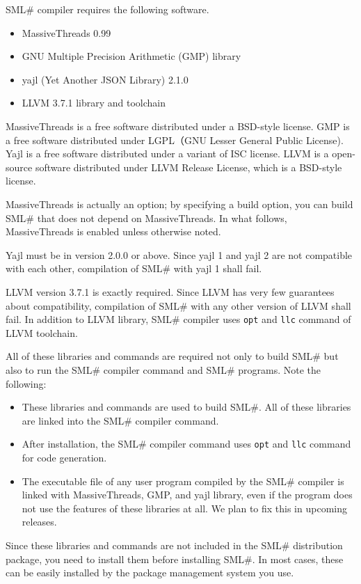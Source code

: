 \documentclass{jbook}
\newcommand{\smlsharp}{SML\#}
\begin{document}
	\smlsharp{} compiler requires the following software.
\begin{itemize}
\item MassiveThreads 0.99
\item GNU Multiple Precision Arithmetic (GMP) library
\item yajl (Yet Another JSON Library) 2.1.0
\item LLVM 3.7.1 library and toolchain
\end{itemize}
	MassiveThreads is a free software distributed under a BSD-style
license.
	GMP is a free software distributed under LGPL（GNU Lesser General
Public License).
	Yajl is a free software distributed under a variant of ISC license.
	LLVM is a open-source software distributed under LLVM Release License,
which is a BSD-style license.

	MassiveThreads is actually an option;
by specifying a build option,
you can build \smlsharp{} that does not depend on MassiveThreads.
	In what follows,
MassiveThreads is enabled unless otherwise noted.

	Yajl must be in version 2.0.0 or above.
	Since yajl 1 and yajl 2 are not compatible with each other,
compilation of \smlsharp{} with yajl 1 shall fail.

	LLVM version 3.7.1 is exactly required.
	Since LLVM has very few guarantees about compatibility,
compilation of \smlsharp{} with any other version of LLVM shall fail.
	In addition to LLVM library,
\smlsharp{} compiler uses {\tt opt} and {\tt llc} command of
LLVM toolchain.

	All of these libraries and commands are required not only to
build \smlsharp{} but also to run the \smlsharp{} compiler command
and \smlsharp{} programs.
	Note the following:
\begin{itemize}
\item
	These libraries and commands are used to build \smlsharp{}.
	All of these libraries are linked into the \smlsharp{} compiler
command.
\item
	After installation,
the \smlsharp{} compiler command uses
{\tt opt} and {\tt llc} command for code generation.
\item
	The executable file of any user program compiled by the \smlsharp{}
compiler is linked with MassiveThreads, GMP, and yajl library,
even if the program does not use the features of these libraries at all.
	We plan to fix this in upcoming releases.
\end{itemize}

	Since these libraries and commands are not included in the \smlsharp{}
distribution package,
you need to install them before installing \smlsharp.
	In most cases,
these can be easily installed by the package management system you use.
\end{document}

